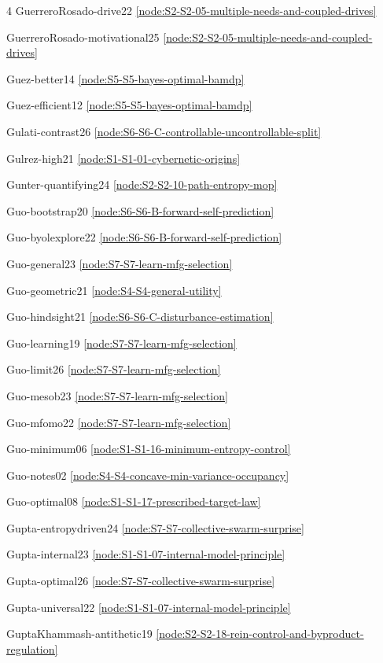 \documentclass[10pt]{article}
\begin{document}
{\begin{multicols}{4}
GuerreroRosado-drive22 \hfill \ref{node:S2-S2-05-multiple-needs-and-coupled-drives}\par
GuerreroRosado-motivational25 \hfill \ref{node:S2-S2-05-multiple-needs-and-coupled-drives}\par
Guez-better14 \hfill \ref{node:S5-S5-bayes-optimal-bamdp}\par
Guez-efficient12 \hfill \ref{node:S5-S5-bayes-optimal-bamdp}\par
Gulati-contrast26 \hfill \ref{node:S6-S6-C-controllable-uncontrollable-split}\par
Gulrez-high21 \hfill \ref{node:S1-S1-01-cybernetic-origins}\par
Gunter-quantifying24 \hfill \ref{node:S2-S2-10-path-entropy-mop}\par
Guo-bootstrap20 \hfill \ref{node:S6-S6-B-forward-self-prediction}\par
Guo-byolexplore22 \hfill \ref{node:S6-S6-B-forward-self-prediction}\par
Guo-general23 \hfill \ref{node:S7-S7-learn-mfg-selection}\par
Guo-geometric21 \hfill \ref{node:S4-S4-general-utility}\par
Guo-hindsight21 \hfill \ref{node:S6-S6-C-disturbance-estimation}\par
Guo-learning19 \hfill \ref{node:S7-S7-learn-mfg-selection}\par
Guo-limit26 \hfill \ref{node:S7-S7-learn-mfg-selection}\par
Guo-mesob23 \hfill \ref{node:S7-S7-learn-mfg-selection}\par
Guo-mfomo22 \hfill \ref{node:S7-S7-learn-mfg-selection}\par
Guo-minimum06 \hfill \ref{node:S1-S1-16-minimum-entropy-control}\par
Guo-notes02 \hfill \ref{node:S4-S4-concave-min-variance-occupancy}\par
Guo-optimal08 \hfill \ref{node:S1-S1-17-prescribed-target-law}\par
Gupta-entropydriven24 \hfill \ref{node:S7-S7-collective-swarm-surprise}\par
Gupta-internal23 \hfill \ref{node:S1-S1-07-internal-model-principle}\par
Gupta-optimal26 \hfill \ref{node:S7-S7-collective-swarm-surprise}\par
Gupta-universal22 \hfill \ref{node:S1-S1-07-internal-model-principle}\par
GuptaKhammash-antithetic19 \hfill \ref{node:S2-S2-18-rein-control-and-byproduct-regulation}\par


\end{multicols}}
\end{document}
